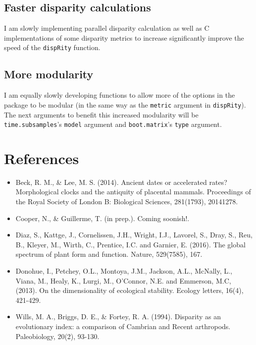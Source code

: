 \documentclass[]{book}
\providecommand{\tightlist}{%
  \setlength{\itemsep}{0pt}\setlength{\parskip}{0pt}}
\theoremstyle{definition}
\theoremstyle{definition}
\theoremstyle{remark}
\begin{document}
\section{Faster disparity
calculations}\label{faster-disparity-calculations}

I am slowly implementing parallel disparity calculation as well as C
implementations of some disparity metrics to increase significantly
improve the speed of the \texttt{dispRity} function.

\section{More modularity}\label{more-modularity}

I am equally slowly developing functions to allow more of the options in
the package to be modular (in the same way as the \texttt{metric}
argument in \texttt{dispRity}). The next arguments to benefit this
increased modularity will be \texttt{time.subsamples}'s \texttt{model}
argument and \texttt{boot.matrix}'s \texttt{type} argument.

\chapter{References}\label{references}

\begin{itemize}
\tightlist
\item
  Beck, R. M., \& Lee, M. S. (2014). Ancient dates or accelerated rates?
  Morphological clocks and the antiquity of placental mammals.
  Proceedings of the Royal Society of London B: Biological Sciences,
  281(1793), 20141278.
\item
  Cooper, N., \& Guillerme, T. (in prep.). Coming soonish!.
\item
  Diaz, S., Kattge, J., Cornelissen, J.H., Wright, I.J., Lavorel, S.,
  Dray, S., Reu, B., Kleyer, M., Wirth, C., Prentice, I.C. and Garnier,
  E. (2016). The global spectrum of plant form and function. Nature,
  529(7585), 167.
\item
  Donohue, I., Petchey, O.L., Montoya, J.M., Jackson, A.L., McNally, L.,
  Viana, M., Healy, K., Lurgi, M., O'Connor, N.E. and Emmerson, M.C,
  (2013). On the dimensionality of ecological stability. Ecology
  letters, 16(4), 421-429.
\item
  Wills, M. A., Briggs, D. E., \& Fortey, R. A. (1994). Disparity as an
  evolutionary index: a comparison of Cambrian and Recent arthropods.
  Paleobiology, 20(2), 93-130.
\end{itemize}


\end{document}
